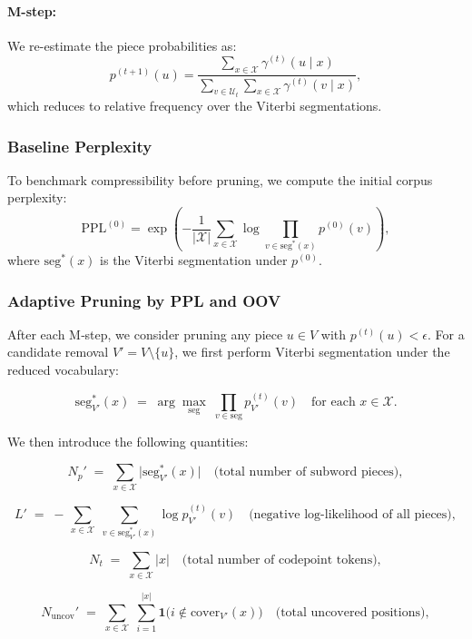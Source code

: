 \paragraph{M-step:}

We re-estimate the piece probabilities as:
\[
p^{(t+1)}(u)
= \frac{
	\sum_{x \in \mathcal X} \gamma^{(t)}(u \mid x)
}{
	\sum_{v \in \mathcal U_t} \sum_{x \in \mathcal X} \gamma^{(t)}(v \mid x)
},
\]
which reduces to relative frequency over the Viterbi segmentations.

\subsubsection{Baseline Perplexity}

To benchmark compressibility before pruning, we compute the initial corpus perplexity:
\[
\mathrm{PPL}^{(0)}
= \exp\left(
-\frac{1}{|\mathcal X|} \sum_{x\in\mathcal X} \log \prod_{v \in \mathrm{seg}^{*}(x)} p^{(0)}(v)
\right),
\]
where \(\mathrm{seg}^{*}(x)\) is the Viterbi segmentation under \(p^{(0)}\).







\subsubsection{Adaptive Pruning by PPL and OOV}

After each M‐step, we consider pruning any piece \(u\in V\) with \(p^{(t)}(u)<\epsilon\).  For a candidate removal \(V' = V \setminus \{u\}\), we first perform Viterbi segmentation under the reduced vocabulary:

\[
\mathrm{seg}^{*}_{V'}(x) \;=\;\arg\max_{\mathrm{seg}} \;\prod_{v\in\mathrm{seg}} p^{(t)}_{V'}(v)
\quad\text{for each }x\in\mathcal X.
\]

We then introduce the following quantities:

\[
N_{p}' \;=\;\sum_{x\in\mathcal X} \bigl|\mathrm{seg}^{*}_{V'}(x)\bigr|
\quad\text{(total number of subword pieces)},
\]

\[
L' \;=\; -\,\sum_{x\in\mathcal X}\;\sum_{v\in\mathrm{seg}^{*}_{V'}(x)}\log p^{(t)}_{V'}(v)
\quad\text{(negative log‐likelihood of all pieces)},
\]

\[
N_{t} \;=\;\sum_{x\in\mathcal X} |x|
\quad\text{(total number of codepoint tokens)},
\]

\[
N_{\mathrm{uncov}}' 
\;=\; \sum_{x\in\mathcal X}\;\sum_{i=1}^{|x|}
\mathbf1\bigl(i\not\in \mathrm{cover}_{V'}(x)\bigr)
\quad\text{(total uncovered positions)},
\]

